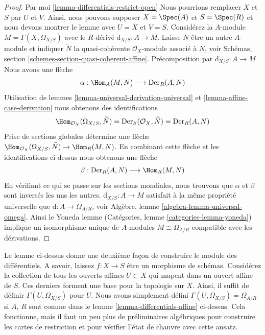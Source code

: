 \begin{proof}

Par moi \ref{lemma-differentials-restrict-open} Nous pourrions remplacer
$X$ et $S$ par $U$ et $V$. Ainsi, nous pouvons supposer $X = \Spec(A)$
et $S = \Spec(R)$ et nous devons montrer le lemme avec $U = X$
et $V = S$. Considérez la $A$-module $M = \Gamma(X, \Omega_{X/S})$
avec le $R$-dérivé $\text{d}_{X/S} : A \to M$. Laisse $N$ être un autre $A$-module et indiquer $\widetilde{N}$ la quasi-cohérente
$\mathcal{O}_X$-module associé à $N$, voir Schémas, section \ref{schemes-section-quasi-coherent-affine}. Précomposition par $\text{d}_{X/S} : A \to M$ Nous avons une flèche
$$
\alpha : \Hom_A(M, N) \longrightarrow \text{Der}_R(A, N)
$$
Utilisation de lemmes \ref{lemma-universal-derivation-universal} et
\ref{lemma-affine-case-derivation} nous obtenons des identifications
$$
\Hom_{\mathcal{O}_X}(\Omega_{X/S}, \widetilde{N}) =
\text{Der}_S(\mathcal{O}_X, \widetilde{N}) =
\text{Der}_R(A, N)
$$
Prise de sections globales détermine une flèche
$\Hom_{\mathcal{O}_X}(\Omega_{X/S}, \widetilde{N}) \to \Hom_R(M, N)$. En combinant cette flèche et les identifications ci-dessus nous obtenons une flèche
$$
\beta : \text{Der}_R(A, N) \longrightarrow \Hom_R(M, N)
$$
En vérifiant ce qui se passe sur les sections mondiales, nous trouvons que $\alpha$
et $\beta$ sont inversés les uns les autres.
$\text{d}_{X/S} : A \to M$ satisfait à la même propriété universelle que $\text{d} : A \to \Omega_{A/R}$, voir Algèbre, lemme \ref{algebra-lemma-universal-omega}. Ainsi le Yoneda lemme (Catégories, lemme \ref{categories-lemma-yoneda}) implique un isomorphisme unique de $A$-modules
$M \cong \Omega_{A/R}$ compatible avec les dérivations.

\end{proof}

\begin{remark}

\label{remark-differentials-glue}
Le lemme ci-dessus donne une deuxième façon de construire le module des différentiels. A savoir, laissez $f : X \to S$ être un morphisme de schémas. Considérez la collection de tous les ouverts affines $U \subset X$ qui mapent dans un ouvert affine de $S$. Ces derniers forment une base pour la topologie sur $X$. Ainsi, il suffit de définir $\Gamma(U, \Omega_{X/S})$ pour $U$. Nous avons simplement défini $\Gamma(U, \Omega_{X/S}) = \Omega_{A/R}$ si $A$, $R$ sont comme dans le lemme \ref{lemma-differentials-affine} ci-dessus. Cela fonctionne, mais il faut un peu plus de préliminaires algébriques pour construire les cartes de restriction et pour vérifier l'état de chanvre avec cette ansatz.
\end{remark}

